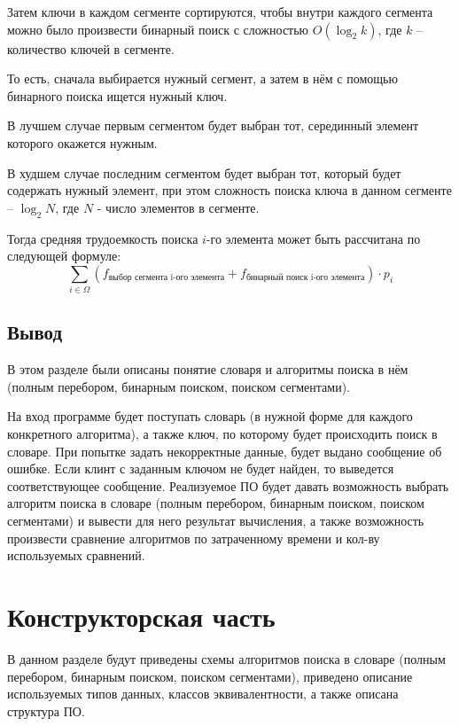 \documentclass[a4paper,14pt, unknownkeysallowed]{extreport}
\begin{document}
Затем ключи в каждом сегменте сортируются, чтобы внутри каждого сегмента можно было произвести бинарный поиск с сложностью $O(\log_2 k)$, где $k$ -- количество ключей в сегменте.

То есть, сначала выбирается нужный сегмент, а затем в нём с помощью бинарного поиска ищется нужный ключ.

В лучшем случае первым сегментом будет выбран тот, серединный элемент которого окажется нужным.

В худшем случае последним сегментом будет выбран тот, который будет содержать нужный элемент, при этом сложность поиска ключа в данном сегменте -- $\log_2 N$, где $N$ - число элементов в сегменте.

Тогда средняя трудоемкость поиска $i$-го элемента может быть рассчитана по следующей формуле:
\begin{equation}
	\sum_{i \in \Omega}{\left(f_{\text{выбор сегмента i-ого элемента}} + f_{\text{бинарный поиск i-ого элемента}}\right)} \cdot p_i
\end{equation}

\clearpage

\section{Вывод}

В этом разделе были описаны понятие словаря и алгоритмы поиска в нём (полным перебором, бинарным поиском, поиском сегментами).

На вход программе будет поступать словарь (в нужной форме для каждого конкретного алгоритма), а также ключ, по которому будет происходить поиск в словаре. При попытке задать некорректные данные, будет выдано сообщение об ошибке. Если клинт с заданным ключом не будет найден, то выведется соответствующее сообщение. Реализуемое ПО будет давать возможность выбрать алгоритм поиска в словаре (полным перебором, бинарным поиском, поиском сегментами) и вывести для него результат вычисления, а также возможность произвести сравнение алгоритмов по затраченному времени и кол-ву используемых сравнений.





\chapter{Конструкторская часть}

В данном разделе будут приведены схемы алгоритмов поиска в словаре (полным перебором, бинарным поиском, поиском сегментами), приведено описание используемых типов данных, классов эквивалентности, а также описана структура ПО.
\end{document}
